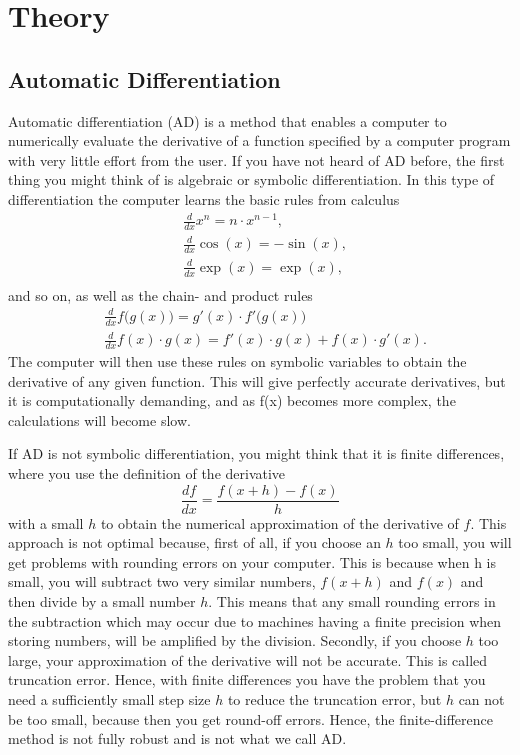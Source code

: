 \chapter{Theory}
\label{ch:theory}
\section{Automatic Differentiation}
\label{sec:AD}
Automatic differentiation (AD) is a method that enables a computer to numerically evaluate the derivative of a function specified by a computer program with very little effort from the user. If you have not heard of AD before, the first thing you might think of is algebraic or symbolic differentiation. In this type of differentiation the computer learns the basic rules from calculus
\begin{align*}
    &\frac{d}{dx}x^n     = n\cdot x^{n-1}, \\
    &\frac{d}{dx}\cos(x)  = -\sin(x), \\
    &\frac{d}{dx}\exp(x) = \exp(x), \\
\end{align*}
and so on, as well as the chain- and product rules
\begin{align*}
    &\frac{d}{dx}f\bigl(g(x)\bigr) = g'(x)\cdot f'\bigl(g(x)\bigr)\\
    &\frac{d}{dx}f(x)\cdot g(x) = f'(x)\cdot g(x) + f(x)\cdot g'(x).
\end{align*}
The computer will then use these rules on symbolic variables to obtain the derivative of any given function. This will give perfectly accurate derivatives, but it is computationally demanding, and as f(x) becomes more complex, the calculations will become slow.

If AD is not symbolic differentiation, you might think that it is finite differences, where you use the definition of the derivative
\begin{equation*}
    \frac{df}{dx} = \frac{f(x+h) - f(x)}{h}
\end{equation*}
with a small $h$ to obtain the numerical approximation of the derivative of $f$. This approach is not optimal because, first of all, if you choose an $h$ too small, you will get problems with rounding errors on your computer. This is because when h is small, you will subtract two very similar numbers, $f(x+h)$ and $f(x)$ and then divide by a small number $h$. This means that any small rounding errors in the subtraction which may occur due to machines having a finite precision when storing numbers, will be amplified by the division. Secondly, if you choose $h$ too large, your approximation of the derivative will not be accurate. This is called truncation error. Hence, with finite differences you have the problem that you need a sufficiently small step size $h$ to reduce the truncation error, but $h$ can not be too small, because then you get round-off errors. Hence, the finite-difference method is not fully robust and is not what we call AD.

